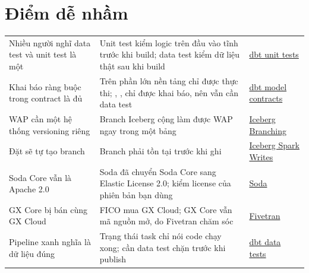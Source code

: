 \section{Điểm dễ nhầm}
\begin{xltabular}{\textwidth}{@{}P{4.2cm} L P{3.4cm}@{}}
\toprule
{} &  &  \\
\midrule
\endhead
\bottomrule
\endfoot
Nhiều người nghĩ data test và unit test là một & Unit test kiểm logic trên đầu vào tĩnh trước khi build; data test kiểm dữ liệu thật sau khi build & \href{https://docs.getdbt.com/docs/build/unit-tests}{dbt unit tests} \\
Khai báo ràng buộc  trong contract là đủ & Trên phần lớn nền tảng chỉ  được thực thi; , ,  chỉ được khai báo, nên vẫn cần data test & \href{https://docs.getdbt.com/docs/mesh/govern/model-contracts}{dbt model contracts} \\
WAP cần một hệ thống versioning riêng & Branch Iceberg cộng  làm được WAP ngay trong một bảng & \href{https://iceberg.apache.org/docs/latest/branching/}{Iceberg Branching} \\
Đặt  sẽ tự tạo branch & Branch phải tồn tại trước khi ghi & \href{https://iceberg.apache.org/docs/latest/spark-writes/}{Iceberg Spark Writes} \\
Soda Core vẫn là Apache 2.0 & Soda đã chuyển Soda Core sang Elastic License 2.0; kiểm license của phiên bản bạn dùng & \href{https://soda.io/blog/soda-core-license-update-moving-to-elastic-license}{Soda} \\
GX Core bị bán cùng GX Cloud & FICO mua GX Cloud; GX Core vẫn mã nguồn mở, do Fivetran chăm sóc & \href{https://www.fivetran.com/press/fivetran-to-become-steward-of-the-great-expectations-open-source-community-and-gx-core-project}{Fivetran} \\
Pipeline xanh nghĩa là dữ liệu đúng & Trạng thái task chỉ nói code chạy xong; cần data test chặn trước khi publish & \href{https://docs.getdbt.com/docs/build/data-tests}{dbt data tests} \\
\end{xltabular}
